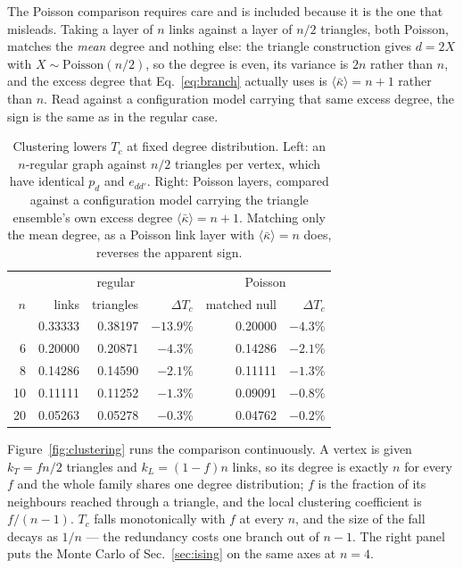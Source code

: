 \documentclass[aps,pre,twocolumn,superscriptaddress,floatfix]{revtex4-2}
\newcommand{\ave}[1]{\langle #1 \rangle}
\newcommand{\kbar}{\bar\kappa}
\begin{document}
The Poisson comparison requires care and is included because it is the one that
misleads. Taking a layer of $n$ links against a layer of $n/2$ triangles, both
Poisson, matches the \emph{mean} degree and nothing else: the triangle
construction gives $d=2X$ with $X\sim\mathrm{Poisson}(n/2)$, so the degree is
even, its variance is $2n$ rather than $n$, and the excess degree that
Eq.~\eqref{eq:branch} actually uses is $\ave{\kbar}=n+1$ rather than $n$. Read
against a configuration model carrying that same excess degree, the sign is the
same as in the regular case.

\begin{table}[t]
\caption{\label{tab:tc}Clustering lowers $T_c$ at fixed degree distribution.
Left: an $n$-regular graph against $n/2$ triangles per vertex, which have
identical $p_d$ and $e_{dd'}$. Right: Poisson layers, compared against a
configuration model carrying the triangle ensemble's own excess degree
$\ave{\kbar}=n+1$. Matching only the mean degree, as a Poisson link layer with
$\ave{\kbar}=n$ does, reverses the apparent sign.}
\begin{ruledtabular}
\begin{tabular}{rrrrrr}
 & \multicolumn{3}{c}{regular} & \multicolumn{2}{c}{Poisson} \\
$n$ & links & triangles & $\Delta T_c$ & matched null & $\Delta T_c$ \\
\colrule
 4 & 0.33333 & 0.38197 & $-13.9\%$ & 0.20000 & $-4.3\%$ \\
 6 & 0.20000 & 0.20871 & $-4.3\%$  & 0.14286 & $-2.1\%$ \\
 8 & 0.14286 & 0.14590 & $-2.1\%$  & 0.11111 & $-1.3\%$ \\
10 & 0.11111 & 0.11252 & $-1.3\%$  & 0.09091 & $-0.8\%$ \\
20 & 0.05263 & 0.05278 & $-0.3\%$  & 0.04762 & $-0.2\%$ \\
\end{tabular}
\end{ruledtabular}
\end{table}

Figure~\ref{fig:clustering} runs the comparison continuously. A vertex is given
$k_T=fn/2$ triangles and $k_L=(1-f)n$ links, so its degree is exactly $n$ for
every $f$ and the whole family shares one degree distribution; $f$ is the
fraction of its neighbours reached through a triangle, and the local clustering
coefficient is $f/(n-1)$. $T_c$ falls monotonically with $f$ at every $n$, and
the size of the fall decays as $1/n$ --- the redundancy costs one branch out of
$n-1$. The right panel puts the Monte Carlo of Sec.~\ref{sec:ising} on the same
axes at $n=4$.
\end{document}
